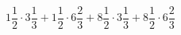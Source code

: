 \begin{ex}[type=calculate_rational]
	\begin{condition}
		\( 1\dfrac{1}{2}\cdot3\dfrac{1}{3}+1\dfrac{1}{2}\cdot6\dfrac{2}{3}+8\dfrac{1}{2}\cdot3\dfrac{1}{3}+8\dfrac{1}{2}\cdot6\dfrac{2}{3} \)
	\end{condition}
	\answer{}
\end{ex}